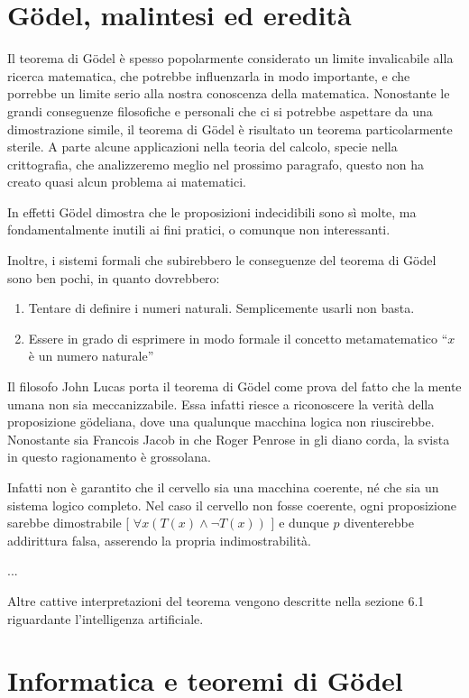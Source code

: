 \documentclass[a4paper,10pt]{article}
\begin{document}
\section{Gödel, malintesi ed eredità}
Il teorema di Gödel è spesso popolarmente considerato un limite invalicabile alla ricerca matematica, che potrebbe influenzarla in modo importante, e che porrebbe un limite serio alla nostra conoscenza della matematica.
Nonostante le grandi conseguenze filosofiche e personali che ci si potrebbe aspettare da una dimostrazione simile, il teorema di Gödel è risultato un teorema particolarmente sterile. A parte alcune applicazioni nella teoria del calcolo, specie nella crittografia, che analizzeremo meglio nel prossimo paragrafo, questo non ha creato quasi alcun problema ai matematici.

In effetti Gödel dimostra che le proposizioni indecidibili sono sì molte, ma fondamentalmente inutili ai fini pratici, o comunque non interessanti.

Inoltre, i sistemi formali che subirebbero le conseguenze del teorema di Gödel sono ben pochi, in quanto dovrebbero: \cite{wp-teo-godel-it}
\begin{enumerate}
 \item Tentare di definire i numeri naturali. Semplicemente usarli non basta.
 \item Essere in grado di esprimere in modo formale il concetto metamatematico \textquotedblleft$x$ è un numero naturale\textquotedblright
\end{enumerate}

Il filosofo John Lucas porta il teorema di Gödel come prova del fatto che la mente umana non sia meccanizzabile. Essa infatti riesce a riconoscere la verità della proposizione gödeliana, dove una qualunque macchina logica non riuscirebbe. Nonostante sia Francois Jacob in \cite{jacob71} che Roger Penrose in \cite{penrose91} gli diano corda, la svista in questo ragionamento è grossolana.

Infatti non è garantito che il cervello sia una macchina coerente, né che sia un sistema logico completo. Nel caso il cervello non fosse coerente, ogni proposizione sarebbe dimostrabile [ $\forall x (T(x)\wedge\neg T(x))$ ] e dunque $p$ diventerebbe addirittura falsa, asserendo la propria indimostrabilità.

...

Altre cattive interpretazioni del teorema vengono descritte nella sezione 6.1 riguardante l'intelligenza artificiale.

\section{Informatica e teoremi di Gödel}
\end{document}
